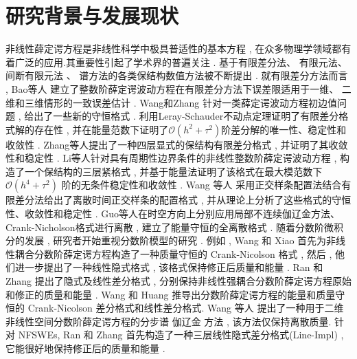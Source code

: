 \section{研究背景与发展现状}
非线性薛定谔方程是非线性科学中极具普适性的基本方程 , 在众多物理学领域都有着广泛的应用.其重要性引起了学术界的普遍关注 . 基于有限差分法、 有限元法\cite{karakashianSpacetimeFiniteElement1998}、 间断有限元法\cite{zhangConservativeLocalDiscontinuous2017} 、 谱方法\cite{gongConservativeFourierPseudospectral2017}的各类保结构数值方法被不断提出 . 
就有限差分方法而言 , Bao等人\cite{baoUniformErrorEstimates2012} 建立了整数阶薛定谔波动方程在有限差分方法下误差限适用于一维、 二维和三维情形的一致误差估计 . 
Wang和Zhang\cite{wangAnalysisNewConservative2006} 针对一类薛定谔波动方程初边值问题 , 给出了一些新的守恒格式 . 利用Leray-Schauder不动点定理证明了有限差分格式解的存在性 , 
并在能量范数下证明了$\mathcal{O}(h^2+\tau^2)$阶差分解的唯一性、稳定性和收敛性 . Zhang等人\cite{zhangConservativeNumericalScheme2003}提出了一种四层显式的保结构有限差分格式 , 并证明了其收敛性和稳定性 . 
Li等人\cite{liCompactFiniteDifference2012}针对具有周期性边界条件的非线性整数阶薛定谔波动方程 , 构造了一个保结构的三层紧格式 , 并基于能量法证明了该格式在最大模范数下$\mathcal{O}(h^4+\tau^2)$ 阶的无条件稳定性和收敛性 . 
Wang 等人\cite{wangDiscretetimeOrthogonalSpline2011} 采用正交样条配置法结合有限差分法给出了离散时间正交样条的配置格式 , 并从理论上分析了这些格式的守恒性、收敛性和稳定性 . 
Guo等人\cite{guoEnergyConservingLocal2015}在时空方向上分别应用局部不连续伽辽金方法、Crank-Nicholson格式进行离散 , 建立了能量守恒的全离散格式 . 
随着分数阶微积分的发展 , 研究者开始重视分数阶模型的研究 .
例如 , Wang 和 Xiao \cite{wangCrankNicolsonDifference2013} 首先为非线性耦合分数阶薛定谔方程构造了一种质量守恒的 Crank-Nicolson 格式 , 
然后 , 他们进一步提出了一种线性隐式格式 , 该格式保持修正后质量和能量\cite{wangLinearlyImplicitConservative2014} . 
Ran 和 Zhang \cite{ranConservativeDifferenceScheme2016} 提出了隐式及线性差分格式 , 分别保持非线性强耦合分数阶薛定谔方程原始和修正的质量和能量 . 
Wang 和 Huang \cite{wangEnergyConservativeDifference2015,wangConservativeLinearizedDifference2015} 推导出分数阶薛定谔方程的能量和质量守恒的 Crank-Nicolson 差分格式和线性差分格式.
Wang 等人 \cite{wangSplitstepSpectralGalerkin2019} 提出了一种用于二维非线性空间分数阶薛定谔方程的分步谱 伽辽金 方法 , 该方法仅保持离散质量.
针对 NFSWEs, Ran 和 Zhang \cite{ranLinearlyImplicitConservative2016} 首先构造了一种三层线性隐式差分格式(Line-Impl) , 它能很好地保持修正后的质量和能量 . 
